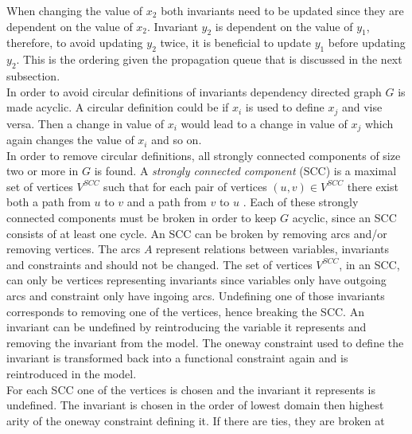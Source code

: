 When changing the value of $x_2$ both invariants need to be updated since they are dependent on the value of $x_2$. 
Invariant $y_2$ is dependent on the value of $y_1$, therefore, to avoid updating $y_2$ twice, it is beneficial to 
update $y_1$ before updating $y_2$. This is the ordering given the propagation queue that is discussed in the next 
subsection. \medskip \\
In order to avoid circular definitions of invariants dependency directed graph $G$ is made acyclic. A circular 
definition could be if $x_i$ is used to define $x_j$ and vise versa. Then a change in value of $x_i$ would lead to a 
change in value of $x_j$ which again changes the value of $x_i$ and so on.  \\ 
In order to remove circular definitions, all strongly connected components of size two or more in $G$ is found. A 
\emph{strongly connected component} (SCC) is a maximal set of vertices $V^{SCC}$ such that for each pair of vertices 
$(u,v) \in V^{SCC}$ there exist both a path from $u$ to $v$ and a path from $v$ to $u$ \cite[p. 1170]{cormen}. 
Each of these strongly connected components must be broken in order to keep $G$ acyclic, since an SCC consists of at 
least one cycle. An SCC can be broken by removing arcs and/or removing vertices. The arcs $A$ represent relations 
between variables, invariants and constraints and should not be changed. The set of vertices $V^{SCC}$, in an SCC, can 
only be vertices representing invariants since variables only have outgoing arcs and constraint only have ingoing arcs. 
Undefining one of those invariants corresponds to removing one of the vertices, hence breaking the SCC. An invariant can 
be undefined by reintroducing the variable it represents and removing the invariant from the model. The oneway 
constraint used to define the invariant is transformed back into a functional constraint again and is reintroduced in 
the model. \\
For each SCC one of the vertices is chosen and the invariant it represents is undefined. The invariant is chosen in the 
order of lowest domain then highest arity of the oneway constraint defining it. If there are ties, they are broken at 
